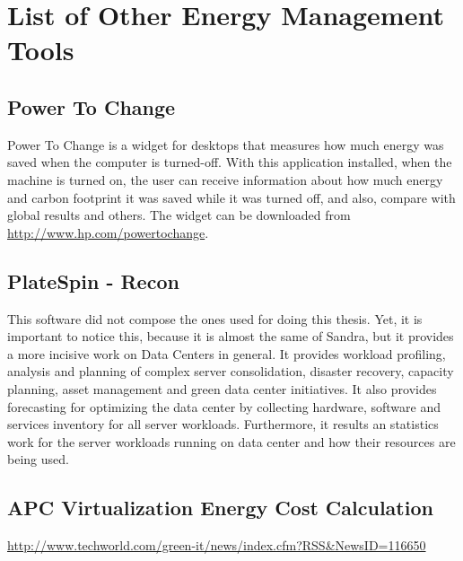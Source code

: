 

\chapter{List of Other Energy Management Tools} \label{app:list_other_energy_management_tools}
    \section{Power To Change} \label{app:power_to_change}
    Power To Change is a widget for desktops that measures how much energy was saved when the computer is turned-off. With this application installed, when the machine is turned on, the user can receive information about how much energy and carbon footprint it was saved while it was turned off, and also, compare with global results and others.
    The widget can be downloaded from \url{http://www.hp.com/powertochange}.

    \section{PlateSpin - Recon} \label{app:power_recon}
    This software did not compose the ones used for doing this thesis. Yet, it is important to notice this, because it is almost the same of Sandra, but it provides a more incisive work on Data Centers in general. It provides workload profiling, analysis and planning of complex server consolidation, disaster recovery, capacity planning, asset management and green data center initiatives. It also provides forecasting for optimizing the data center by collecting hardware, software and services inventory for all server workloads. Furthermore, it results an statistics work for the server workloads running on data center and how their resources are being used.
    
    \section{APC Virtualization Energy Cost Calculation}\label{app:apc_virtualization_energy_cost_calculation}
        \url{http://www.techworld.com/green-it/news/index.cfm?RSS&NewsID=116650}
        
        
